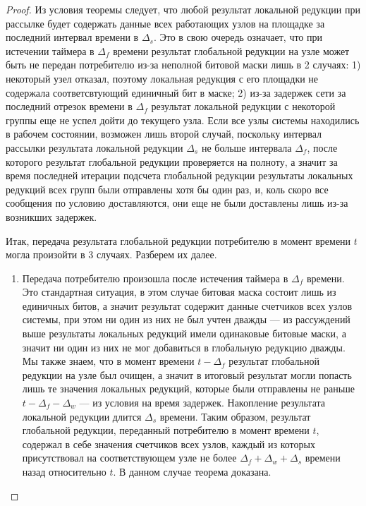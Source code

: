 \begin{proof}
    Из условия теоремы следует, что любой результат локальной редукции при рассылке будет содержать данные всех работающих узлов на площадке за последний интервал времени в $\Delta_s$. Это в свою очередь означает, что при истечении таймера в $\Delta_f$ времени результат глобальной редукции на узле может быть не передан потребителю из-за неполной битовой маски лишь в 2 случаях: 1) некоторый узел отказал, поэтому локальная редукция с его площадки не содержала соответсвтующий единичный бит в маске; 2) из-за задержек сети за последний отрезок времени в $\Delta_f$ результат локальной редукции с некоторой группы еще не успел дойти до текущего узла. Если все узлы системы находились в рабочем состоянии, возможен лишь второй случай, поскольку интервал рассылки результата локальной редукции $\Delta_s$ не больше интервала $\Delta_f$, после которого результат глобальной редукции проверяется на полноту, а значит за время последней итерации подсчета глобальной редукции результаты локальных редукций всех групп были отправлены хотя бы один раз, и, коль скоро все сообщения по условию доставляются, они еще не были доставлены лишь из-за возникших задержек.
    
    Итак, передача результата глобальной редукции потребителю в момент времени $t$ могла произойти в 3 случаях. Разберем их далее.
    
    \begin{enumerate}
        \item Передача потребителю произошла после истечения таймера в $\Delta_f$ времени. Это стандартная ситуация, в этом случае битовая маска состоит лишь из единичных битов, а значит результат содержит данные счетчиков всех узлов системы, при этом ни один из них не был учтен дважды --- из рассуждений выше результаты локальных редукций имели одинаковые битовые маски, а значит ни один из них не мог добавиться в глобальную редукцию дважды. Мы также знаем, что в момент времени $t - \Delta_f$ результат глобальной редукции на узле был очищен, а значит в итоговый результат могли попасть лишь те значения локальных редукций, которые были отправлены не раньше $t - \Delta_f - \Delta_w$ --- из условия на время задержек. Накопление результата локальной редукции длится $\Delta_s$ времени. Таким образом, результат глобальной редукции, переданный потребителю в момент времени $t$, содержал в себе значения счетчиков всех узлов, каждый из которых присутствовал на соответствующем узле не более $\Delta_f + \Delta_w + \Delta_s$ времени назад относительно $t$. В данном случае теорема доказана.
        

\end{enumerate}
\end{proof}
